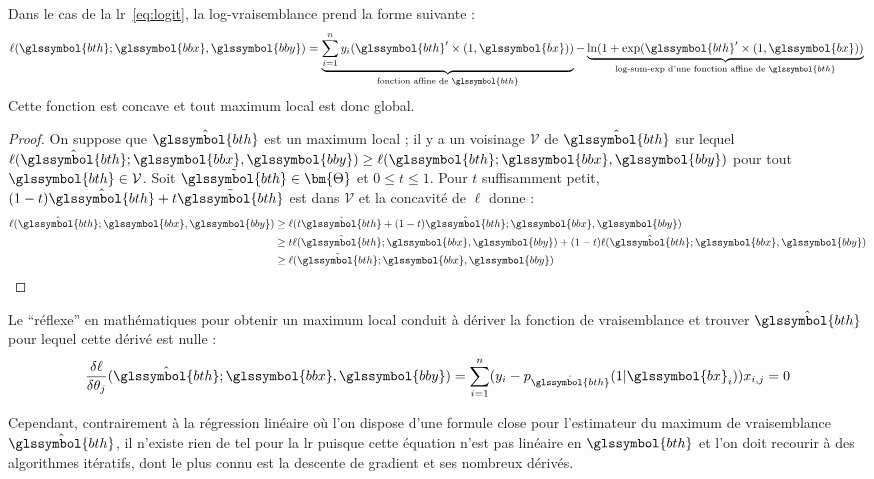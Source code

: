 Dans le cas de la \gls{lr}~\eqref{eq:logit}, la log-vraisemblance prend la forme suivante :
\[ \ell(\glssymbol{bth};\glssymbol{bbx},\glssymbol{bby}) = \underbrace{\sum_{i=1}^n y_i (\glssymbol{bth}' \times (1,\glssymbol{bx}))}_{\text{fonction affine de } \glssymbol{bth}} - \underbrace{\ln(1 + \exp(\glssymbol{bth}' \times (1,\glssymbol{bx}))}_{\text{log-sum-exp d'une fonction affine de } \glssymbol{bth}} \qedhere \]
Cette fonction est concave et tout maximum local est donc global. 
\begin{proof}
On suppose que $\hat{\glssymbol{bth}}$ est un maximum local ; il y a un voisinage $\mathcal{V}$ de $\hat{\glssymbol{bth}}$ sur lequel $\ell(\hat{\glssymbol{bth}};\glssymbol{bbx},\glssymbol{bby}) \geq \ell(\glssymbol{bth};\glssymbol{bbx},\glssymbol{bby})$ pour tout $\glssymbol{bth} \in \mathcal{V}$. Soit $\tilde{\glssymbol{bth}} \in \bm{\Theta}$ et $0 \leq t \leq 1$. Pour $t$ suffisamment petit, $(1-t)\hat{\glssymbol{bth}} + t \tilde{\glssymbol{bth}}$ est dans $\mathcal{V}$ et la concavité de $\ell$ donne :
\begin{align*}
\ell(\hat{\glssymbol{bth}};\glssymbol{bbx},\glssymbol{bby}) & \geq \ell(t \tilde{\glssymbol{bth}} + (1-t)\hat{\glssymbol{bth}};\glssymbol{bbx},\glssymbol{bby}) \\
& \geq t \ell(\tilde{\glssymbol{bth}};\glssymbol{bbx},\glssymbol{bby}) + (1-t) \ell(\hat{\glssymbol{bth}};\glssymbol{bbx},\glssymbol{bby}) \\
& \geq \ell(\tilde{\glssymbol{bth}};\glssymbol{bbx},\glssymbol{bby})
\end{align*}
\end{proof}

Le ``réflexe'' en mathématiques pour obtenir un maximum local conduit à dériver la fonction de vraisemblance et trouver $\hat{\glssymbol{bth}}$ pour lequel cette dérivé est nulle :
\[ \dfrac{\delta \ell}{\delta \theta_j} (\hat{\glssymbol{bth}};\glssymbol{bbx},\glssymbol{bby})= \sum_{i=1}^n (y_i - p_{\hat{\glssymbol{bth}}}(1|\glssymbol{bx}_i)) x_{i,j} = 0\]

Cependant, contrairement à la régression linéaire où l'on dispose d'une formule close pour l'estimateur du maximum de vraisemblance $\hat{\glssymbol{bth}}$, il n'existe rien de tel pour la \gls{lr} puisque cette équation n'est pas linéaire en $\glssymbol{bth}$ et l'on doit recourir à des algorithmes itératifs, dont le plus connu est la descente de gradient et ses nombreux dérivés.

